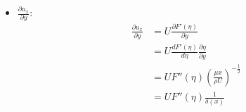 \documentclass[../main.tex]{subfiles}
\begin{document}
\begin{itemize}
\begin{itemize}
\begin{enumerate}
\begin{itemize}
\begin{align}
        &= \frac{U}{2x}\delta(x) \left(
          \eta F'(\eta) - \int F'(\eta) d\eta
        \right) + G(x)
      \end{align}
      這裡就是為什麼要定$F'(\eta)$的原因，因為這樣積分會比較簡單
      \begin{equation}
        \boxed{u_y = \frac{U}{2x}\delta(x) \left(\eta F'(\eta) - F(\eta)\right) + G(x)}
      \end{equation}
      這裡有個支線任務，我們能帶入邊界條件$u_y(x,0) = 0$來求出$G(x)$
      \begin{align}
        u_y(x,0) &= 0 \nonumber\\
        \implies 0 &= \frac{U}{2x}\delta(x) \left(\eta F'(\eta) - F(\eta)\right)+ G(x) \nonumber\\
        \implies G(x) &= -\frac{U}{2x}\delta(x) \left(\eta F'(\eta) - F(\eta)\right)
      \end{align}
      而根據No slip的Boundary Condition，$F'(0)=0$
      \begin{equation}
        G(x) = \frac{U}{2x}\delta(x) F(0) = \frac{F(0)}{2}\sqrt{\frac{\mu U}{\rho x}}
      \end{equation}
      寫進去$u_y$:
      \begin{equation}
        u_y = \frac{U}{2x}\delta(x) \left(\eta F'(\eta) - F(\eta) + F(0)\right)
      \end{equation}
      至於$F(0)$的話，我們把他認為是\\
      所以就讓$F(0)=0$，原話如下:
      \begin{quote}
        With no loss in generality given the functional form of $f$ can compenstate
      \end{quote}
      所以$G(x)$就消失了!
      \begin{equation}
        \boxed{u_y = \frac{U}{2x}\delta(x) \left(\eta F'(\eta) - F(\eta)\right)}
      \end{equation}
      \item $\frac{\partial u_x}{\partial y}$:
      \begin{align}
        \frac{\partial u_x}{\partial y} &= U \frac{\partial F'(\eta)}{\partial y} \nonumber\\
        &= U \frac{d F'(\eta)}{d \eta} \frac{\partial \eta}{\partial y} \nonumber\\
        &= U F''(\eta) \left(
          \frac{\mu x}{\rho U}
        \right)^{-\frac{1}{2}} \nonumber\\
        &= U F''(\eta) \frac{1}{\delta(x)} \nonumber\\

\end{align}
\end{itemize}
\end{enumerate}
\end{itemize}
\end{itemize}
\end{document}
